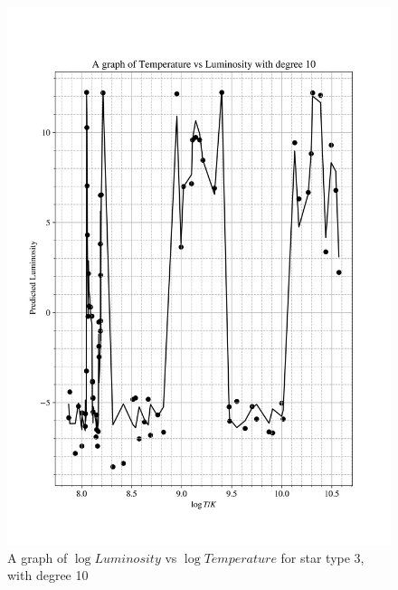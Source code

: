 \documentclass[12pt, a4paper]{article}
\begin{document}
\begin{figure}[H]
    \centering
    \includegraphics[width = \textwidth]{2Plot4_10.png}
    \caption{A graph of \(\log{Luminosity}\) vs \(\log{Temperature}\) for star type 3, with degree 10}
\end{figure}
\end{document}
